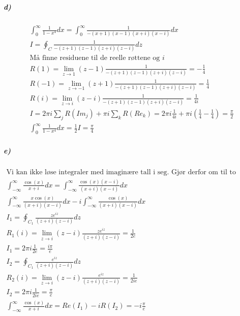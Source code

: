 \documentclass[11pt, A4paper,norsk]{article}
\begin{document}
			\subparagraph{d)}
				\begin{gather*}
\int_{0}^{\infty} \frac{1}{1 - x^4} dx = \int_{0}^{\infty} \frac{1}{- (x + 1) (x - 1) (x + i) (x - i)} dx \\
I = \oint_{C} \frac{1}{- (z + 1) (z - 1) (z + i) (z - i)} dz \\
\text{Må finne residuene til de reelle røttene og $i$} \\
R(1) = \lim_{z \rightarrow 1} (z - 1) \frac{1}{- (z + 1) (z - 1) (z + i) (z - i)} = - \frac{1}{4} \\
R(- 1) = \lim_{z \rightarrow - 1} (z + 1) \frac{1}{- (z + 1) (z - 1) (z + i) (z - i)} = \frac{1}{4} \\
R(i) = \lim_{z \rightarrow i} (z - i) \frac{1}{- (z + 1) (z - 1) (z + i) (z - i)} = \frac{1}{4i} \\
I = 2 \pi i \sum_{j} R(Im_j) + \pi i \sum_{k} R(Re_k) = 2 \pi i \frac{1}{4i} + \pi i \left( \frac{1}{4} - \frac{1}{4} \right) = \frac{\pi}{2} \\
\int_{0}^{\infty} \frac{1}{1 - x^4} dx = \frac{1}{2} I = \frac{\pi}{4}
				\end{gather*}










			\subparagraph{e)}
				\begin{gather*}
\text{Vi kan ikke løse integraler med imaginære tall i seg. Gjør derfor om til to integraler} \\
\int_{- \infty}^{\infty} \frac{\cos(x)}{x + i} dx = \int_{- \infty}^{\infty} \frac{\cos(x) (x - i)}{(x + i) (x - i)} dx \\
\int_{- \infty}^{\infty} \frac{x \cos(x)}{(x + i) (x - i)} dx - i \int_{- \infty}^{\infty} \frac{\cos(x)}{(x + i) (x - i)} dx \\
I_1 = \oint_{C_1} \frac{z e^{iz}}{(z + i) (z - i)} dz \\
R_1(i) = \lim_{z \rightarrow i} (z - i) \frac{z e^{iz}}{(z + i) (z - i)} = \frac{1}{2e} \\
I_1 = 2 \pi i \frac{1}{2e} = \frac{i \pi}{e} \\
I_2 = \oint_{C_1} \frac{e^{iz}}{(z + i) (z - i)} dz \\
R_2(i) = \lim_{z \rightarrow i} (z - i) \frac{e^{iz}}{(z + i) (z - i)} = \frac{1}{2 i e} \\
I_2 = 2 \pi i \frac{1}{2 i e} = \frac{\pi}{e} \\
\int_{- \infty}^{\infty} \frac{\cos(x)}{x + i} dx = Re(I_1) - i R(I_2) = - i \frac{\pi}{e}
				\end{gather*}
\end{document}
